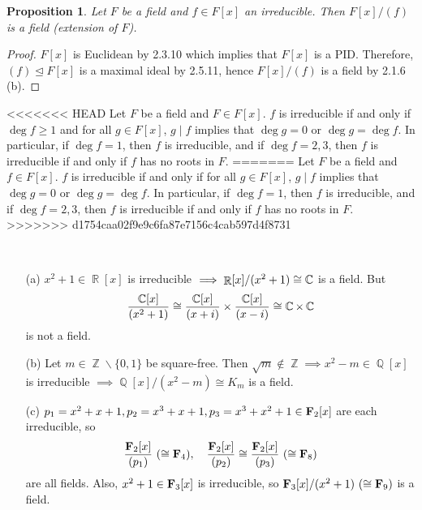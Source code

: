 \documentclass[11pt]{book}
\newcounter{counter}
\newtheorem{proposition}[counter]{Proposition}   \newtheorem{problem}[counter]{Problem}   \newtheorem*{proposition*}{Proposition}   \newtheorem*{lemma*}{Lemma}
\theoremstyle{definition}   \newtheorem{defn}[counter]{Definition} %
\newcommand{\bs}{\backslash}   \newcommand{\A}{\mathcal{A}}   \newcommand{\sy}{\textnormal{Syl}}   \newcommand{\size}[1]{\left| #1 \right|}
\newcommand{\nsg}{\mathrel{\unlhd}}   \newcommand{\ind}{\parindent24pt}   \newcommand{\vn}{\varnothing}
\DeclareMathOperator{\R}{\mathbb{R}}   \DeclareMathOperator{\N}{\mathbb{N}}   \DeclareMathOperator{\z}{\mathbb{Z}}   \DeclareMathOperator{\Q}{\mathbb{Q}}
\newcommand{\vs}{\vspace{8pt}}
\numberwithin{counter}{chapter}
\begin{document}
\vs

\begin{proposition}
Let $F$ be a field and $f \in F[x]$ an irreducible. Then $F[x]/(f)$ is a field (extension of $F$).
\end{proposition}

\begin{proof}
$F[x]$ is Euclidean by 2.3.10 which implies that $F[x]$ is a PID. Therefore, $(f) \nsg F[x]$ is a maximal ideal by 2.5.11, hence $F[x]/(f)$ is a field by 2.1.6 (b).
\end{proof}

\vs

\begin{remark}
<<<<<<< HEAD
Let $F$ be a field and $F \in F[x]$. $f$ is irreducible if and only if $\deg f \geq 1$ and for all $g \in F[x]$, $g \mid f$ implies that $\deg g = 0$ or $\deg g = \deg f$. In particular, if $\deg f = 1$, then $f$ is irreducible, and if $\deg f = 2,3$, then $f$ is irreducible if and only if $f$ has no roots in $F$.
=======
Let $F$ be a field and $f \in F[x]$. $f$ is irreducible if and only if for all $g \in F[x]$, $g \mid f$ implies that $\deg g = 0$ or $\deg g = \deg f$. In particular, if $\deg f = 1$, then $f$ is irreducible, and if $\deg f = 2,3$, then $f$ is irreducible if and only if $f$ has no roots in $F$.
>>>>>>> d1754caa02f9e9c6fa87e7156c4cab597d4f8731
\end{remark}

\vs

\begin{example}
\
\begin{enumerate}
\item[(a)] $x^2 + 1 \in \R[x]$ is irreducible $\implies \R[x]/(x^2+1) \cong \C$ is a field. But 	\[\frac{\operatorname{\mathbb{C}}[x]}{(x^2+1)} \cong \frac{\operatorname{\mathbb{C}}[x]}{(x+i)} \times \frac{\operatorname{\mathbb{C}}[x]}{(x-i)} \cong \operatorname{\mathbb{C}} \times \operatorname{\mathbb{C}} \]
is not a field.
\item[(b)] Let $m \in \z\bs\{0,1\}$ be square-free. Then $\sqrt{m} \notin \z \implies x^2-m \in \Q[x]$ is irreducible $\implies \Q[x]/(x^2-m) \cong K_m$ is a field.
\item[(c)] $p_1 = x^2 + x + 1, p_2 = x^3 + x + 1, p_3 = x^3 + x^2 + 1 \in \operatorname{\mathbf{F}}_2[x]$ are each irreducible, so
	\[\frac{\operatorname{\mathbf{F}}_2[x]}{(p_1)} \ (\cong \operatorname{\mathbf{F}}_4), \quad \frac{\operatorname{\mathbf{F}}_2[x]}{(p_2)} \cong \frac{\operatorname{\mathbf{F}}_2[x]}{(p_3)} \ (\cong \operatorname{\mathbf{F}}_8) \]
are all fields. Also, $x^2 + 1 \in \operatorname{\mathbf{F}}_3[x]$ is irreducible, so $\operatorname{\mathbf{F}}_3[x]/(x^2+1) \ (\cong \operatorname{\mathbf{F}}_9)$ is a field.
\end{enumerate}
\end{example}
\end{document}
